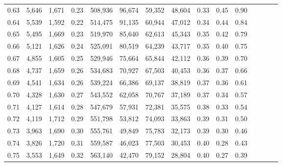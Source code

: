 \begin{tabular}{rrrcrrrrrrrrrrr}
0.63 &   5,646 &  1,671 &                                       0.23 &  508,936 &   96,674 &   59,352 &   48,604 &  0.33 &  0.45 &                         0.90 \\
0.64 &   5,539 &  1,592 &                                       0.22 &  514,475 &   91,135 &   60,944 &   47,012 &  0.34 &  0.44 &                         0.84 \\
0.65 &   5,495 &  1,669 &                                       0.23 &  519,970 &   85,640 &   62,613 &   45,343 &  0.35 &  0.42 &                         0.79 \\
0.66 &   5,121 &  1,626 &                                       0.24 &  525,091 &   80,519 &   64,239 &   43,717 &  0.35 &  0.40 &                         0.75 \\
0.67 &   4,855 &  1,605 &                                       0.25 &  529,946 &   75,664 &   65,844 &   42,112 &  0.36 &  0.39 &                         0.70 \\
0.68 &   4,737 &  1,659 &                                       0.26 &  534,683 &   70,927 &   67,503 &   40,453 &  0.36 &  0.37 &                         0.66 \\
0.69 &   4,541 &  1,634 &                                       0.26 &  539,224 &   66,386 &   69,137 &   38,819 &  0.37 &  0.36 &                         0.61 \\
0.70 &   4,328 &  1,630 &                                       0.27 &  543,552 &   62,058 &   70,767 &   37,189 &  0.37 &  0.34 &                         0.57 \\
0.71 &   4,127 &  1,614 &                                       0.28 &  547,679 &   57,931 &   72,381 &   35,575 &  0.38 &  0.33 &                         0.54 \\
0.72 &   4,119 &  1,712 &                                       0.29 &  551,798 &   53,812 &   74,093 &   33,863 &  0.39 &  0.31 &                         0.50 \\
0.73 &   3,963 &  1,690 &                                       0.30 &  555,761 &   49,849 &   75,783 &   32,173 &  0.39 &  0.30 &                         0.46 \\
0.74 &   3,826 &  1,720 &                                       0.31 &  559,587 &   46,023 &   77,503 &   30,453 &  0.40 &  0.28 &                         0.43 \\
0.75 &   3,553 &  1,649 &                                       0.32 &  563,140 &   42,470 &   79,152 &   28,804 &  0.40 &  0.27 &                         0.39 \\

\end{tabular}
